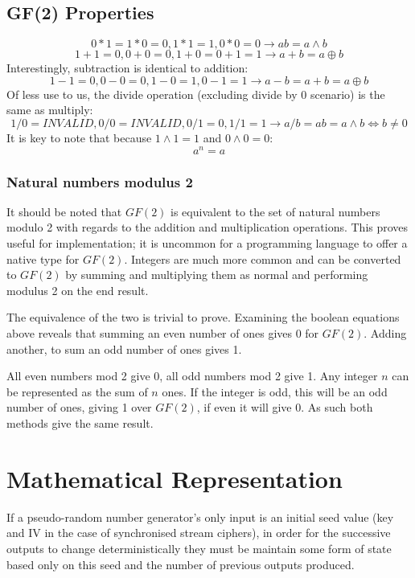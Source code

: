 \documentclass{report}
\let\Oldsection\section
\renewcommand{\section}{\FloatBarrier\Oldsection}
\let\Oldsubsection\subsection
\renewcommand{\subsection}{\FloatBarrier\Oldsubsection}
\let\Oldsubsubsection\subsubsection
\renewcommand{\subsubsection}{\FloatBarrier\Oldsubsubsection}
\begin{document}
\subsection{GF(2) Properties}
\begin{equation} \label{eq:GFtimes}
0*1 = 1*0=0, 1*1=1, 0*0=0 \to ab = a \land b
\end{equation}
\begin{equation} \label{eq:GFadd}
1+1=0, 0+0=0, 1+0=0+1=1 \to a+b = a \oplus b
\end{equation}
Interestingly, subtraction is identical to addition:
\begin{equation} \label{eq:GFminus}
1-1=0, 0-0=0, 1-0=1, 0-1=1 \to a-b = a+b = a \oplus b
\end{equation}
Of less use to us, the divide operation (excluding divide by 0 scenario) is the same as multiply:
\begin{equation} \label{eq:GFdivide}
1/0=\mathit{INVALID}, 0/0=\mathit{INVALID}, 0/1=0, 1/1=1 \to a/b = ab = a \land b \iff b \neq 0
\end{equation}
It is key to note that because $1\land1=1$ and $0\land0 = 0$:
\begin{equation} \label{eq:GFpowers}
a^n = a
\end{equation}

\subsubsection{Natural numbers modulus 2}
It should be noted that $\mathit{GF(2)}$ is equivalent to the set of natural numbers modulo 2 with regards to the addition and multiplication operations. This proves useful for implementation; it is uncommon for a programming language to offer a native type for $\mathit{GF(2)}$. Integers are much more common and can be converted to $\mathit{GF(2)}$ by summing and multiplying them as normal and performing modulus 2 on the end result.

The equivalence of the two is trivial to prove. Examining the boolean equations above reveals that summing an even number of ones gives 0 for $GF(2)$. Adding another, to sum an odd number of ones gives 1.

All even numbers mod 2 give 0, all odd numbers mod 2 give 1. Any integer $n$ can be represented as the sum of $n$ ones. If the integer is odd, this will be an odd number of ones, giving 1 over $GF(2)$, if even it will give 0. As such both methods give the same result.
\newpage
\section{Mathematical Representation}
If a pseudo-random number generator's only input is an initial seed value (key and IV in the case of synchronised stream ciphers), in order for the successive outputs to change deterministically they must be maintain some form of state based only on this seed and the number of previous outputs produced.
\end{document}
